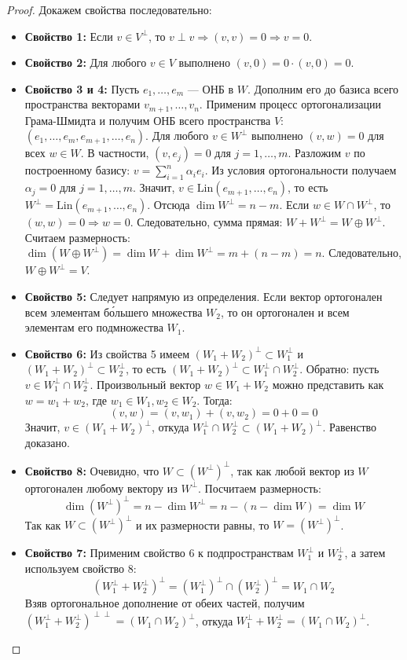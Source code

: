 \begin{proof}
	Докажем свойства последовательно:
	\begin{itemize}
		\item \textbf{Свойство 1:} Если $v \in V^\perp$, то $v \perp v \Rightarrow (v, v) = 0 \Rightarrow v = 0$.
		\item \textbf{Свойство 2:} Для любого $v \in V$ выполнено $(v, 0) = 0 \cdot (v, 0) = 0$.
		\item \textbf{Свойство 3 и 4:} Пусть $e_1, \dots, e_m$ — ОНБ в $W$.
		Дополним его до базиса всего пространства векторами $v_{m+1}, \dots, v_n$.
		Применим процесс ортогонализации Грама-Шмидта и получим ОНБ всего пространства $V$: $(e_1, \dots, e_m, e_{m+1}, \dots, e_n)$.
		Для любого $v \in W^\perp$ выполнено $(v, w) = 0$ для всех $w \in W$.
		В частности, $(v, e_j) = 0$ для $j = 1, \dots, m$.
		Разложим $v$ по построенному базису: $v = \sum_{i=1}^n \alpha_i e_i$.
		Из условия ортогональности получаем $\alpha_j = 0$ для $j = 1, \dots, m$.
		Значит, $v \in \mathrm{Lin}(e_{m+1}, \dots, e_n)$, то есть $W^\perp = \mathrm{Lin}(e_{m+1}, \dots, e_n)$. Отсюда $\dim W^\perp = n - m$.
		Если $w \in W \cap W^\perp$, то $(w, w) = 0 \Rightarrow w = 0$.
		Следовательно, сумма прямая: $W + W^\perp = W \oplus W^\perp$.
		Считаем размерность: $\dim(W \oplus W^\perp) = \dim W + \dim W^\perp = m + (n - m) = n$.
		Следовательно, $W \oplus W^\perp = V$.

		\item \textbf{Свойство 5:} Следует напрямую из определения.
		Если вектор ортогонален всем элементам б\'ольшего множества $W_2$, то он ортогонален и всем элементам его подмножества $W_1$.
		\item \textbf{Свойство 6:} Из свойства 5 имеем $(W_1 + W_2)^\perp \subset W_1^\perp$ и $(W_1 + W_2)^\perp \subset W_2^\perp$, то есть $(W_1 + W_2)^\perp \subset W_1^\perp \cap W_2^\perp$.
		Обратно: пусть $v \in W_1^\perp \cap W_2^\perp$. Произвольный вектор $w \in W_1 + W_2$ можно представить как $w = w_1 + w_2$, где $w_1 \in W_1, w_2 \in W_2$.
		Тогда:
		\[
		(v, w) = (v, w_1) + (v, w_2) = 0 + 0 = 0
		\] 
		Значит, $v \in (W_1 + W_2)^\perp$, откуда $W_1^\perp \cap W_2^\perp \subset (W_1 + W_2)^\perp$.
		Равенство доказано.

		\item \textbf{Свойство 8:} Очевидно, что $W \subset (W^\perp)^\perp$, так как любой вектор из $W$ ортогонален любому вектору из $W^\perp$.
		Посчитаем размерность:
		\[
		\dim(W^\perp)^\perp = n - \dim W^\perp = n - (n - \dim W) = \dim W
		\] 
		Так как $W \subset (W^\perp)^\perp$ и их размерности равны, то $W = (W^\perp)^\perp$.
		\item \textbf{Свойство 7:} Применим свойство 6 к подпространствам $W_1^\perp$ и $W_2^\perp$, а затем используем свойство 8:
		\[
		(W_1^\perp + W_2^\perp)^\perp = (W_1^\perp)^\perp \cap (W_2^\perp)^\perp = W_1 \cap W_2
		\] 
		Взяв ортогональное дополнение от обеих частей, получим $(W_1^\perp + W_2^\perp)^{\perp\perp} = (W_1 \cap W_2)^\perp$, откуда $W_1^\perp + W_2^\perp = (W_1 \cap W_2)^\perp$.
	\end{itemize}
\end{proof}
